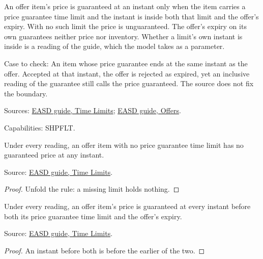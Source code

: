 \begin{definition}
  \label{def:offers-price-guarantee}
  An offer item's price is guaranteed at an instant only when the item
  carries a price guarantee time limit and the instant is inside both that
  limit and the offer's expiry. With no such limit the price is
  unguaranteed. The offer's expiry on its own guarantees neither price nor
  inventory. Whether a limit's own instant is inside is a reading of the
  guide, which the model takes as a parameter.

  Case to check: An item whose price guarantee ends at the same instant as
  the offer. Accepted at that instant, the offer is rejected as expired, yet
  an inclusive reading of the guarantee still calls the price guaranteed.
  The source does not fix the boundary.

  Sources: \href{https://standards.atlassian.net/wiki/spaces/EASD/pages/574423066/Time+Limits}{EASD guide, Time Limits};
  \href{https://standards.atlassian.net/wiki/spaces/EASD/pages/600637464/Offers}{EASD guide, Offers}.

  Capabilities: SHPFLT.
\end{definition}

\begin{theorem}
  \label{thm:offers-no-limit-no-guarantee}
  Under every reading, an offer item with no price guarantee time limit has
  no guaranteed price at any instant.

  Source: \href{https://standards.atlassian.net/wiki/spaces/EASD/pages/574423066/Time+Limits}{EASD guide, Time Limits}.
\end{theorem}
\begin{proof}
  Unfold the rule: a missing limit holds nothing.
\end{proof}

\begin{theorem}
  \label{thm:offers-price-guaranteed-before}
  Under every reading, an offer item's price is guaranteed at every instant
  before both its price guarantee time limit and the offer's expiry.

  Source: \href{https://standards.atlassian.net/wiki/spaces/EASD/pages/574423066/Time+Limits}{EASD guide, Time Limits}.
\end{theorem}
\begin{proof}
  An instant before both is before the earlier of the two.
\end{proof}

